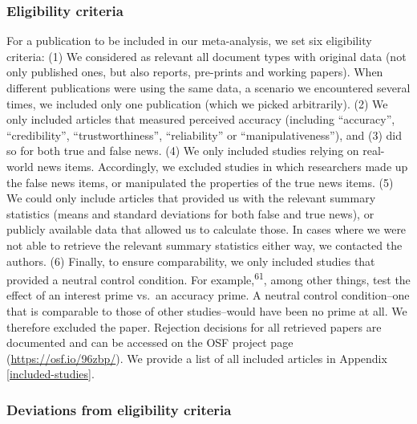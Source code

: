 \documentclass[
  man]{apa6}
\begin{document}
\subsubsection{Eligibility criteria}\label{eligibility-criteria}

For a publication to be included in our meta-analysis, we set six eligibility criteria: (1) We considered as relevant all document types with original data (not only published ones, but also reports, pre-prints and working papers). When different publications were using the same data, a scenario we encountered several times, we included only one publication (which we picked arbitrarily). (2) We only included articles that measured perceived accuracy (including ``accuracy'', ``credibility'', ``trustworthiness'', ``reliability'' or ``manipulativeness''), and (3) did so for both true and false news. (4) We only included studies relying on real-world news items. Accordingly, we excluded studies in which researchers made up the false news items, or manipulated the properties of the true news items. (5) We could only include articles that provided us with the relevant summary statistics (means and standard deviations for both false and true news), or publicly available data that allowed us to calculate those. In cases where we were not able to retrieve the relevant summary statistics either way, we contacted the authors. (6) Finally, to ensure comparability, we only included studies that provided a neutral control condition. For example,\textsuperscript{61}, among other things, test the effect of an interest prime vs.~an accuracy prime. A neutral control condition--one that is comparable to those of other studies--would have been no prime at all. We therefore excluded the paper. Rejection decisions for all retrieved papers are documented and can be accessed on the OSF project page (\url{https://osf.io/96zbp/}). We provide a list of all included articles in Appendix \ref{included-studies}.

\subsubsection{Deviations from eligibility criteria}\label{deviations-from-eligibility-criteria}
\end{document}
